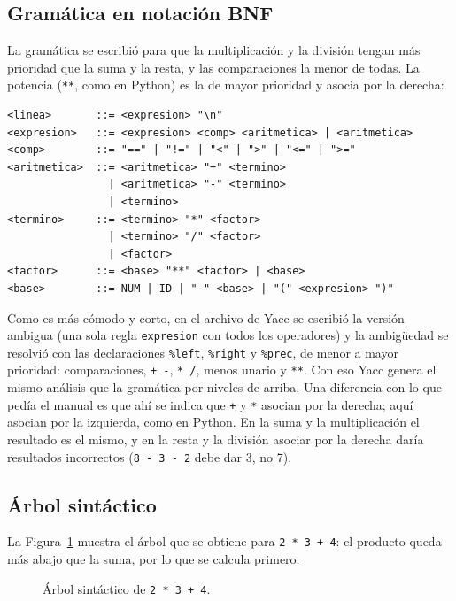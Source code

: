\documentclass{article}
\begin{document}
    \subsection{Gramática en notación BNF}
    La gramática se escribió para que la multiplicación y la división tengan más prioridad que la suma y la resta, y las comparaciones la menor de todas. La potencia (\texttt{**}, como en Python) es la de mayor prioridad y asocia por la derecha:

    \begin{lstlisting}[numbers=none, caption={Gramática en BNF.}]
<linea>       ::= <expresion> "\n"
<expresion>   ::= <expresion> <comp> <aritmetica> | <aritmetica>
<comp>        ::= "==" | "!=" | "<" | ">" | "<=" | ">="
<aritmetica>  ::= <aritmetica> "+" <termino>
                | <aritmetica> "-" <termino>
                | <termino>
<termino>     ::= <termino> "*" <factor>
                | <termino> "/" <factor>
                | <factor>
<factor>      ::= <base> "**" <factor> | <base>
<base>        ::= NUM | ID | "-" <base> | "(" <expresion> ")"
    \end{lstlisting}

    Como es más cómodo y corto, en el archivo de Yacc se escribió la versión ambigua (una sola regla \texttt{expresion} con todos los operadores) y la ambigüedad se resolvió con las declaraciones \texttt{\%left}, \texttt{\%right} y \texttt{\%prec}, de menor a mayor prioridad: comparaciones, \texttt{+ -}, \texttt{* /}, menos unario y \texttt{**}. Con eso Yacc genera el mismo análisis que la gramática por niveles de arriba. Una diferencia con lo que pedía el manual es que ahí se indica que \texttt{+} y \texttt{*} asocian por la derecha; aquí asocian por la izquierda, como en Python. En la suma y la multiplicación el resultado es el mismo, y en la resta y la división asociar por la derecha daría resultados incorrectos (\texttt{8 - 3 - 2} debe dar 3, no 7).

    \subsection{Árbol sintáctico}
    La Figura~\ref{fig:arbol} muestra el árbol que se obtiene para \texttt{2 * 3 + 4}: el producto queda más abajo que la suma, por lo que se calcula primero.

    \begin{figure}[H]
    \centering
    \caption{Árbol sintáctico de \texttt{2 * 3 + 4}.\label{fig:arbol}}
    \end{figure}
\end{document}
